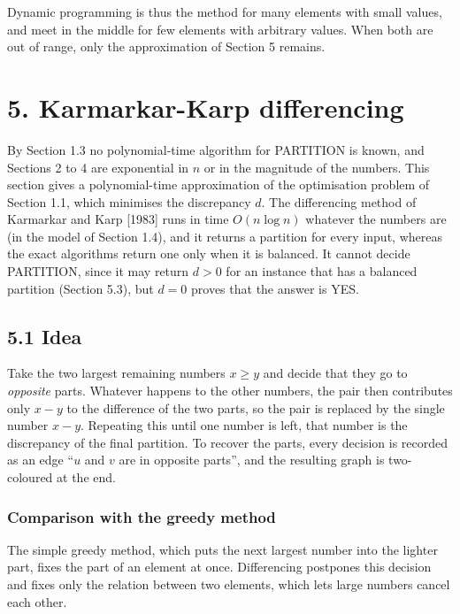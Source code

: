 \documentclass[
]{article}
\begin{document}
Dynamic programming is thus the method for many elements with small
values, and meet in the middle for few elements with arbitrary values.
When both are out of range, only the approximation of Section 5 remains.

\hypertarget{karmarkar-karp-differencing}{%
\section{5. Karmarkar-Karp
differencing}\label{karmarkar-karp-differencing}}

By Section 1.3 no polynomial-time algorithm for PARTITION is known, and
Sections 2 to 4 are exponential in \(n\) or in the magnitude of the
numbers. This section gives a polynomial-time approximation of the
optimisation problem of Section 1.1, which minimises the discrepancy
\(d\). The differencing method of Karmarkar and Karp {[}1983{]} runs in
time \(O(n \log n)\) whatever the numbers are (in the model of Section
1.4), and it returns a partition for every input, whereas the exact
algorithms return one only when it is balanced. It cannot decide
PARTITION, since it may return \(d > 0\) for an instance that has a
balanced partition (Section 5.3), but \(d = 0\) proves that the answer
is YES.

\hypertarget{idea-3}{%
\subsection{5.1 Idea}\label{idea-3}}

Take the two largest remaining numbers \(x \ge y\) and decide that they
go to \emph{opposite} parts. Whatever happens to the other numbers, the
pair then contributes only \(x - y\) to the difference of the two parts,
so the pair is replaced by the single number \(x - y\). Repeating this
until one number is left, that number is the discrepancy of the final
partition. To recover the parts, every decision is recorded as an edge
``\(u\) and \(v\) are in opposite parts'', and the resulting graph is
two-coloured at the end.

\hypertarget{comparison-with-the-greedy-method}{%
\subsubsection{Comparison with the greedy
method}\label{comparison-with-the-greedy-method}}

The simple greedy method, which puts the next largest number into the
lighter part, fixes the part of an element at once. Differencing
postpones this decision and fixes only the relation between two
elements, which lets large numbers cancel each other.
\end{document}
